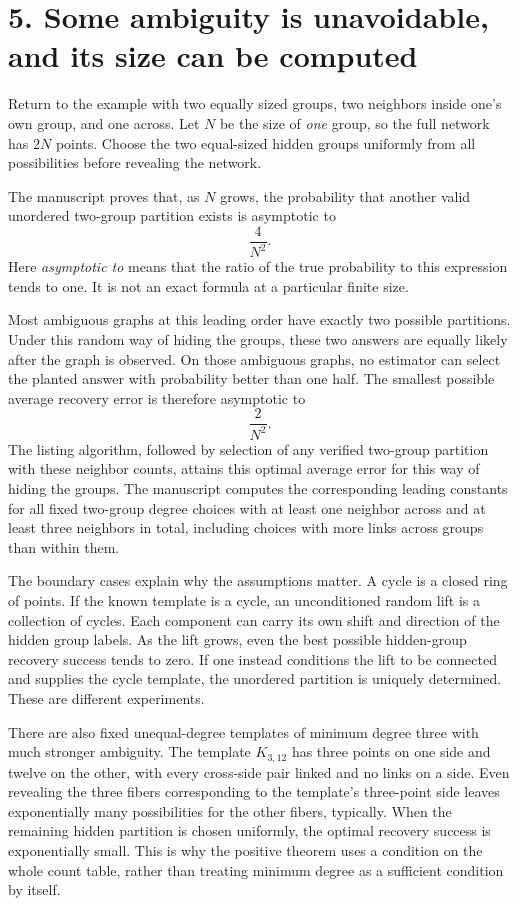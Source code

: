\documentclass[11pt]{article}
\begin{document}
\newpage
\section*{5. Some ambiguity is unavoidable, and its size can be computed}
Return to the example with two equally sized groups, two neighbors
inside one's own group, and one across. Let $N$ be the size of
\emph{one} group, so the full network has $2N$ points. Choose the two
equal-sized hidden groups uniformly from all possibilities before
revealing the network.

The manuscript proves that, as $N$ grows, the probability that another
valid unordered two-group partition exists is asymptotic to
\[
 \frac{4}{N^2}.
\]
Here \emph{asymptotic to} means that the ratio of the true probability
to this expression tends to one. It is not an exact formula at a
particular finite size.

Most ambiguous graphs at this leading order have exactly two possible
partitions. Under this random way of hiding the groups, these two answers
are equally likely after the graph is observed. On those ambiguous
graphs, no estimator can select the planted answer with probability
better than one half. The smallest possible average
recovery error is therefore asymptotic to
\[
 \frac{2}{N^2}.
\]
The listing algorithm, followed by selection of any verified two-group
partition with these neighbor counts,
attains this optimal average error for this way of hiding the groups. The manuscript
computes the corresponding leading constants for all fixed two-group
degree choices with at least one neighbor across and at least three
neighbors in total, including
choices with more links across groups than within them.

The boundary cases explain why the assumptions matter. A cycle is a
closed ring of points. If the known template is a cycle, an unconditioned
random lift is a collection of cycles. Each component can carry its own shift and direction of the
hidden group labels. As the lift grows, even the best possible
hidden-group recovery success tends to zero. If one instead conditions
the lift to be connected and supplies the cycle template, the unordered
partition is uniquely determined. These are different experiments.

There are also fixed unequal-degree templates of minimum degree three
with much stronger ambiguity. The template $K_{3,12}$ has three points
on one side and twelve on the other, with every cross-side pair linked
and no links on a side. Even revealing the three fibers corresponding
to the template's three-point side leaves
exponentially many possibilities for the other fibers, typically.
When the remaining hidden partition is chosen uniformly, the optimal
recovery success is exponentially small. This is why
the positive theorem uses a condition on the whole count table, rather
than treating minimum degree as a sufficient condition by itself.
\end{document}

